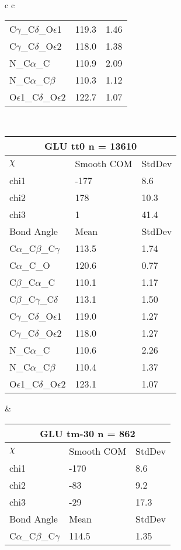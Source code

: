 \begin{longtable}{ c c }
\begin{tabular}{ l l l }
  C$\gamma$\_C$\delta$\_O$\epsilon$1 & 119.3 & 1.46\\
  C$\gamma$\_C$\delta$\_O$\epsilon$2 & 118.0 & 1.38\\
  N\_C$\alpha$\_C & 110.9 & 2.09\\
  N\_C$\alpha$\_C$\beta$ & 110.3 & 1.12\\
  O$\epsilon$1\_C$\delta$\_O$\epsilon$2 & 122.7 & 1.07\\
  \bottomrule
  \end{tabular}
  \\
  \begin{tabular}{ l l l }
  \toprule
  \multicolumn{3}{c}{GLU \textbf{tt0} n = 13610} \\ \toprule
  $\chi$       & Smooth COM & StdDev \\ \midrule
  chi1 & -177 & 8.6 \\ 
  chi2 & 178 & 10.3 \\ 
  chi3 & 1 & 41.4 \\ \midrule
  Bond Angle   & Mean     & StdDev \\ \midrule
  C$\alpha$\_C$\beta$\_C$\gamma$ & 113.5 & 1.74\\
  C$\alpha$\_C\_O & 120.6 & 0.77\\
  C$\beta$\_C$\alpha$\_C & 110.1 & 1.17\\
  C$\beta$\_C$\gamma$\_C$\delta$ & 113.1 & 1.50\\
  C$\gamma$\_C$\delta$\_O$\epsilon$1 & 119.0 & 1.27\\
  C$\gamma$\_C$\delta$\_O$\epsilon$2 & 118.0 & 1.27\\
  N\_C$\alpha$\_C & 110.6 & 2.26\\
  N\_C$\alpha$\_C$\beta$ & 110.4 & 1.37\\
  O$\epsilon$1\_C$\delta$\_O$\epsilon$2 & 123.1 & 1.07\\
  \bottomrule
  \end{tabular}
  &
  \begin{tabular}{ l l l }
  \toprule
  \multicolumn{3}{c}{GLU \textbf{tm-30} n = 862} \\ \toprule
  $\chi$       & Smooth COM & StdDev \\ \midrule
  chi1 & -170 & 8.6 \\ 
  chi2 & -83 & 9.2 \\ 
  chi3 & -29 & 17.3 \\ \midrule
  Bond Angle   & Mean     & StdDev \\ \midrule
  C$\alpha$\_C$\beta$\_C$\gamma$ & 114.5 & 1.35\\

\end{tabular}
\end{longtable}
